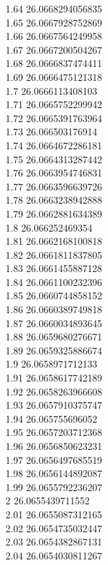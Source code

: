 {1.64	26.0668294056835\\
1.65	26.0667928752869\\
1.66	26.0667564249958\\
1.67	26.0667200504267\\
1.68	26.0666837474411\\
1.69	26.0666475121318\\
1.7	26.0666113408103\\
1.71	26.0665752299942\\
1.72	26.0665391763964\\
1.73	26.066503176914\\
1.74	26.0664672286181\\
1.75	26.0664313287442\\
1.76	26.0663954746831\\
1.77	26.0663596639726\\
1.78	26.0663238942888\\
1.79	26.0662881634389\\
1.8	26.066252469354\\
1.81	26.0662168100818\\
1.82	26.0661811837805\\
1.83	26.0661455887128\\
1.84	26.0661100232396\\
1.85	26.0660744858152\\
1.86	26.0660389749818\\
1.87	26.0660034893645\\
1.88	26.0659680276671\\
1.89	26.0659325886674\\
1.9	26.0658971712133\\
1.91	26.0658617742189\\
1.92	26.0658263966608\\
1.93	26.0657910375747\\
1.94	26.065755696052\\
1.95	26.0657203712368\\
1.96	26.0656850623231\\
1.97	26.0656497685519\\
1.98	26.0656144892087\\
1.99	26.0655792236207\\
2	26.0655439711552\\
2.01	26.0655087312165\\
2.02	26.0654735032447\\
2.03	26.0654382867131\\
2.04	26.0654030811267\\
}
